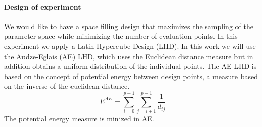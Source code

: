 \paragraph{Design of experiment}
We would like to have a space filling design that maximizes the sampling of the parameter space while minimizing the number of evaluation points.
In this experiment we apply a Latin Hypercube Design (LHD). 
In this work we will use the Audze-Eglais \citep{AudzeEglais, AudzeEglais2, AudzeEglais3} (AE) LHD, which uses the Euclidean distance measure but in addition obtains a uniform distribution of the individual points. 
The AE LHD is based on the concept of potential energy between design points, a measure based on the inverse of the euclidean distance.
\[
E^{AE} = \sum_{i=0}^{p-1} {\sum_{j=i+1}^{p-1} {\frac{1}{d_{ij}}}}
\]
The potential energy measure is minized in AE.
